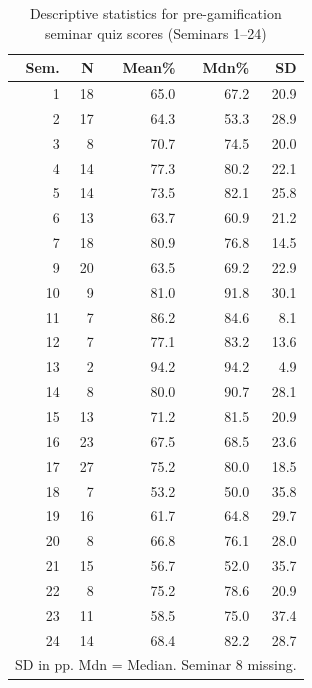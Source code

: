 \begin{table}[!h]
\centering
\caption{Descriptive statistics for pre-gamification seminar quiz scores (Seminars 1--24)}
\label{tab:seminar-stats-pre}
\small
\begin{tabular}{rrrrr}
\hline
\textbf{Sem.} & \textbf{N} & \textbf{Mean\%} & \textbf{Mdn\%} & \textbf{SD} \\
\hline
1  & 18 & 65.0 & 67.2 & 20.9 \\
2  & 17 & 64.3 & 53.3 & 28.9 \\
3  & 8  & 70.7 & 74.5 & 20.0 \\
4  & 14 & 77.3 & 80.2 & 22.1 \\
5  & 14 & 73.5 & 82.1 & 25.8 \\
6  & 13 & 63.7 & 60.9 & 21.2 \\
7  & 18 & 80.9 & 76.8 & 14.5 \\
9  & 20 & 63.5 & 69.2 & 22.9 \\
10 & 9  & 81.0 & 91.8 & 30.1 \\
11 & 7  & 86.2 & 84.6 & 8.1 \\
12 & 7  & 77.1 & 83.2 & 13.6 \\
13 & 2  & 94.2 & 94.2 & 4.9 \\
14 & 8  & 80.0 & 90.7 & 28.1 \\
15 & 13 & 71.2 & 81.5 & 20.9 \\
16 & 23 & 67.5 & 68.5 & 23.6 \\
17 & 27 & 75.2 & 80.0 & 18.5 \\
18 & 7  & 53.2 & 50.0 & 35.8 \\
19 & 16 & 61.7 & 64.8 & 29.7 \\
20 & 8  & 66.8 & 76.1 & 28.0 \\
21 & 15 & 56.7 & 52.0 & 35.7 \\
22 & 8  & 75.2 & 78.6 & 20.9 \\
23 & 11 & 58.5 & 75.0 & 37.4 \\
24 & 14 & 68.4 & 82.2 & 28.7 \\
\hline
\multicolumn{5}{l}{\footnotesize SD in pp. Mdn = Median. Seminar 8 missing.}
\end{tabular}
\end{table}

